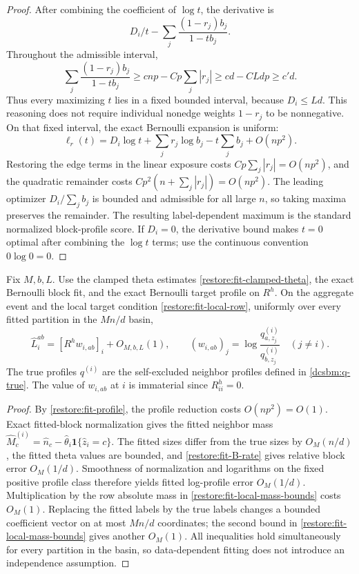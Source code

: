 \begin{proof}
After combining the coefficient of $\log t$, the derivative is
\[
 D_i/t-\sum_j\frac{(1-r_j)b_j}{1-tb_j}.
\]
Throughout the admissible interval,
\[
 \sum_j\frac{(1-r_j)b_j}{1-tb_j}
 \ge cnp-Cp\sum_j|r_j|
 \ge cd-CLdp\ge c'd.
\]
Thus every maximizing $t$ lies in a fixed bounded interval,
because $D_i\le Ld$. This reasoning does not require individual
nonedge weights $1-r_j$ to be nonnegative.
On that fixed interval, the exact Bernoulli expansion is uniform:
\[
 \ell_r(t)
   =D_i\log t+\sum_jr_j\log b_j
         -t\sum_jb_j+O(np^2).
\]
Restoring the edge terms in the linear exposure costs
$Cp\sum_j|r_j|=O(np^2)$, and the quadratic remainder costs
$Cp^2(n+\sum_j|r_j|)=O(np^2)$.
The leading optimizer $D_i/\sum_jb_j$ is bounded and admissible
for all large $n$, so taking maxima preserves the remainder.
The resulting label-dependent maximum is the standard normalized
block-profile score. If $D_i=0$, the derivative bound makes $t=0$
optimal after combining the $\log t$ terms; use the continuous
convention $0\log0=0$.
\end{proof}

\begin{proposition}
\label{restore:fit-uniform-score}
\label{restore:fit-score}
Fix $M,b,L$. Use the clamped theta estimates
\eqref{restore:fit-clamped-theta}, the exact Bernoulli block fit, and
the exact Bernoulli target profile on $R^h$.
On the aggregate event and the local target condition
\eqref{restore:fit-local-row}, uniformly over every fitted partition
in the $Mn/d$ basin,
\begin{equation}\label{restore:fit-true-score}
 \widehat L_i^{ab}
       =[R^h w_{i,ab}]_i+O_{M,b,L}(1),\qquad
 (w_{i,ab})_j=
     \log\frac{q_{a,z_j}^{(i)}}{q_{b,z_j}^{(i)}}\quad(j\ne i).
\end{equation}
The true profiles $q^{(i)}$ are the self-excluded neighbor profiles
defined in \eqref{dcsbm:q-true}. The value of $w_{i,ab}$ at $i$ is immaterial since
$R^h_{ii}=0$.
\end{proposition}

\begin{proof}
By \cref{restore:fit-profile}, the profile reduction costs
$O(np^2)=O(1)$. Exact fitted-block normalization gives the fitted
neighbor mass
$\widehat M_c^{(i)}
 =\widehat n_c-\widehat\theta_i\mathbf1\{\widehat z_i=c\}$.
The fitted sizes differ from the true sizes by $O_M(n/d)$,
the fitted theta values are bounded, and
\eqref{restore:fit-B-rate} gives relative block error $O_M(1/d)$.
Smoothness of normalization and logarithms on the fixed positive
profile class therefore yields fitted log-profile error $O_M(1/d)$.
Multiplication by the row absolute mass in
\eqref{restore:fit-local-mass-bounds} costs $O_M(1)$.
Replacing the fitted labels by the true labels changes a bounded
coefficient vector on at most $Mn/d$ coordinates; the second bound
in \eqref{restore:fit-local-mass-bounds} gives another $O_M(1)$.
All inequalities hold simultaneously for every partition in the basin,
so data-dependent fitting does not introduce an independence assumption.
\end{proof}

